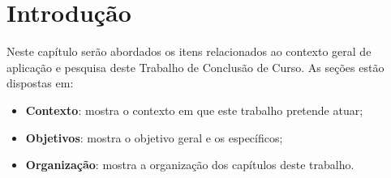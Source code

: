 \chapter{Introdução}
\label{chap:intro}

Neste capítulo serão abordados os itens relacionados ao contexto geral de
aplicação e pesquisa deste Trabalho de Conclusão de Curso. As seções estão
dispostas em:

\begin{itemize}
  \item \textbf{Contexto}: mostra o contexto em que este trabalho pretende
    atuar;
  \item \textbf{Objetivos}: mostra o objetivo geral e os específicos;
  \item \textbf{Organização}: mostra a organização dos capítulos deste
    trabalho.
\end{itemize}





